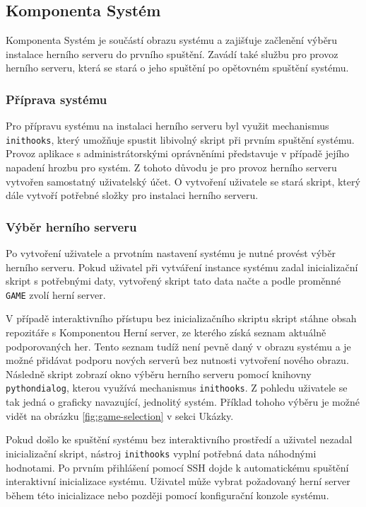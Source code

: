 \subsection{Komponenta Systém}

Komponenta Systém je součástí obrazu systému a zajišťuje začlenění výběru instalace herního serveru do prvního spuštění.
Zavádí také službu pro provoz herního serveru, která se stará o jeho spuštění po opětovném spuštění systému.

\subsubsection{Příprava systému}

Pro přípravu systému na instalaci herního serveru byl využit mechanismus \texttt{inithooks}, který umožňuje
spustit libivolný skript při prvním spuštění systému.
Provoz aplikace s administrátorskými oprávněními představuje v případě jejího napadení hrozbu pro systém.
Z tohoto důvodu je pro provoz herního serveru vytvořen samostatný uživatelský účet. O vytvoření uživatele se stará skript,
který dále vytvoří potřebné složky pro instalaci herního serveru.

\subsubsection{Výběr herního serveru}

Po vytvoření uživatele a prvotním nastavení systému je nutné provést výběr herního serveru.
Pokud uživatel při vytváření instance systému zadal inicializační skript s potřebnými daty, vytvořený skript tato
data načte a podle proměnné \texttt{GAME} zvolí herní server.

V případě interaktivního přístupu bez inicializačního skriptu skript stáhne obsah repozitáře s Komponentou Herní server,
ze kterého získá seznam aktuálně podporovaných her. Tento seznam tudíž není pevně daný v obrazu systému a je možné
přidávat podporu nových serverů bez nutnosti vytvoření nového obrazu.
Následně skript zobrazí okno výběru herního serveru pomocí knihovny \texttt{pythondialog}, kterou využívá mechanismus
\texttt{inithooks}. Z pohledu uživatele se tak jedná o graficky navazující, jednolitý systém. Příklad tohoho výběru
je možné vidět na obrázku \ref{fig:game-selection} v sekci Ukázky.

Pokud došlo ke spuštění systému bez interaktivního prostředí a uživatel nezadal inicializační skript, nástroj \texttt{inithooks} vyplní
potřebná data náhodnými hodnotami. Po prvním přihlášení pomocí SSH dojde k automatickému spuštění interaktivní inicializace systému.
Uživatel může vybrat požadovaný herní server během této inicializace nebo později pomocí konfigurační konzole systému.

